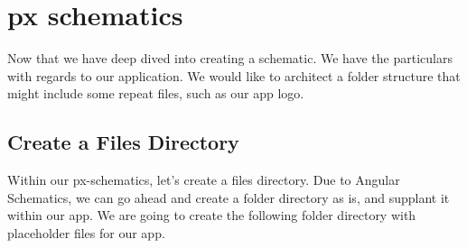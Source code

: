 \maketitle{}
\section{px schematics}

Now that we have deep dived into creating a schematic. We have the particulars
with regards to our application. We would like to architect a folder structure
that might include some repeat files, such as our app logo.


\subsection{Create a Files Directory}
Within our px-schematics, let's create a files directory. Due to Angular
Schematics, we can go ahead and create a folder directory as is, and supplant
it within our app. We are going to create the following folder directory with
placeholder files for our app.
